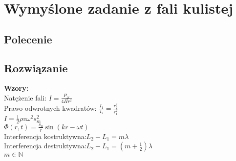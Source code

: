 \documentclass[a4paper,14pt]{extarticle}  %
\begin{document}
    \section{Wymyślone zadanie z fali kulistej}
        \subsection{Polecenie}
        \subsection{Rozwiązanie}
        \textbf{Wzory:}\\
        Natężenie fali: $I=\frac{P_{zr}}{4\Pi r^2}$\\
        Prawo odwrotnych kwadratów: $\frac{I_1}{I_2}=\frac{r_2^2}{r_1^2}$\\
        $I=\frac{1}{2}\rho v \omega ^2 s_m^2$\\
        $\Phi (r,t)=\frac{s_0}{r}\sin (kr-\omega t)$\\
        Interferencja kostruktywna:$L_2-L_1=m\lambda$\\
        Interferencja destruktywna:$L_2-L_1=(m+\frac{1}{2})\lambda$\\
        $m \in \mathbb{N} $
\end{document}
